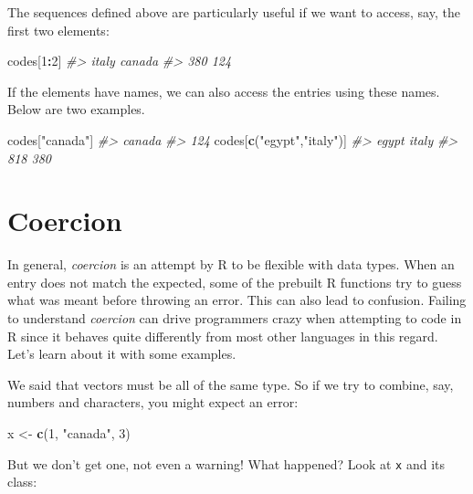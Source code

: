 \documentclass[
]{krantz}
\newenvironment{Shaded}{\begin{snugshade}}{\end{snugshade}}
\newcommand{\CommentTok}[1]{\textcolor[rgb]{0.37,0.37,0.37}{\textit{#1}}}
\newcommand{\DecValTok}[1]{\textcolor[rgb]{0.06,0.06,0.06}{#1}}
\newcommand{\KeywordTok}[1]{\textcolor[rgb]{0.27,0.27,0.27}{\textbf{#1}}}
\newcommand{\NormalTok}[1]{#1}
\newcommand{\OperatorTok}[1]{\textcolor[rgb]{0.43,0.43,0.43}{\textbf{#1}}}
\newcommand{\StringTok}[1]{\textcolor[rgb]{0.5,0.5,0.5}{#1}}
\begin{document}
The sequences defined above are particularly useful if we want to access, say, the first two elements:

\begin{Shaded}
\begin{Highlighting}[]
\NormalTok{codes[}\DecValTok{1}\OperatorTok{:}\DecValTok{2}\NormalTok{]}
\CommentTok{#>  italy canada }
\CommentTok{#>    380    124}
\end{Highlighting}
\end{Shaded}

If the elements have names, we can also access the entries using these names. Below are two examples.

\begin{Shaded}
\begin{Highlighting}[]
\NormalTok{codes[}\StringTok{"canada"}\NormalTok{]}
\CommentTok{#> canada }
\CommentTok{#>    124}
\NormalTok{codes[}\KeywordTok{c}\NormalTok{(}\StringTok{"egypt"}\NormalTok{,}\StringTok{"italy"}\NormalTok{)]}
\CommentTok{#> egypt italy }
\CommentTok{#>   818   380}
\end{Highlighting}
\end{Shaded}

\hypertarget{coercion}{%
\section{Coercion}\label{coercion}}

In general, \emph{coercion} is an attempt by R to be flexible with data types. When an entry does not match the expected, some of the prebuilt R functions try to guess what was meant before throwing an error. This can also lead to confusion. Failing to understand \emph{coercion} can drive programmers crazy when attempting to code in R since it behaves quite differently from most other languages in this regard. Let's learn about it with some examples.

We said that vectors must be all of the same type. So if we try to combine, say, numbers and characters, you might expect an error:

\begin{Shaded}
\begin{Highlighting}[]
\NormalTok{x <-}\StringTok{ }\KeywordTok{c}\NormalTok{(}\DecValTok{1}\NormalTok{, }\StringTok{"canada"}\NormalTok{, }\DecValTok{3}\NormalTok{)}
\end{Highlighting}
\end{Shaded}

But we don't get one, not even a warning! What happened? Look at \texttt{x} and its class:
\end{document}
